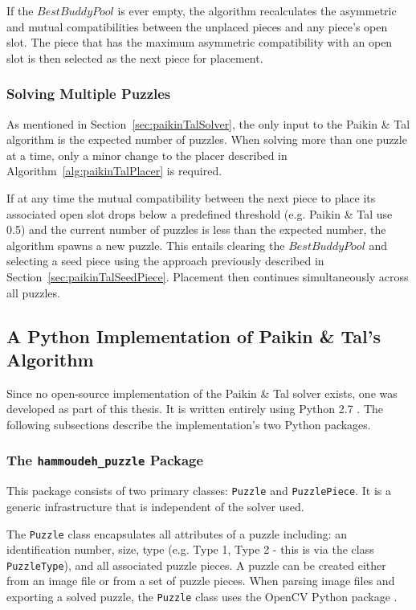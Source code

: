 \documentclass{report}
\newcommand{\hammoudehPuzzlePackage}{\texttt{hammoudeh\_puzzle} }
\begin{document}
If the $BestBuddyPool$ is ever empty, the algorithm recalculates the asymmetric and mutual compatibilities between the unplaced pieces and any piece's open slot.  The piece that has the maximum asymmetric compatibility with an open slot is then selected as the next piece for placement.

\subsubsection{Solving Multiple Puzzles}\label{sec:paikinTalSolvingMultiplePuzzles}

As mentioned in Section~\ref{sec:paikinTalSolver}, the only input to the Paikin \& Tal algorithm is the expected number of puzzles.   When solving more than one puzzle at a time, only a minor change to the placer described in Algorithm~\ref{alg:paikinTalPlacer} is required.

If at any time the mutual compatibility between the next piece to place its associated open slot drops below a predefined threshold (e.g. Paikin \& Tal use 0.5) and the current number of puzzles is less than the expected number, the algorithm spawns a new puzzle.  This entails clearing the $BestBuddyPool$ and selecting a seed piece using the approach previously described in Section~\ref{sec:paikinTalSeedPiece}.   Placement then continues simultaneously across all puzzles.


\subsection{A Python Implementation of Paikin \& Tal's Algorithm}\label{sec:pythonPaikinTalAlgorithm}

Since no open-source implementation of the Paikin \& Tal solver exists, one was developed as part of this thesis.  It is written entirely using Python 2.7 \cite{python}.  The following subsections describe the implementation's two  Python packages.  

\subsubsection{The \hammoudehPuzzlePackage Package}\label{sec:hammoudehPuzzlePackage}

This package consists of two primary classes: \texttt{Puzzle} and \texttt{PuzzlePiece}.  It is a generic infrastructure that is independent of the solver used.  

The \texttt{Puzzle} class encapsulates all attributes of a puzzle including: an identification number, size, type (e.g. Type 1, Type 2 - this is via the class \texttt{PuzzleType}), and all associated puzzle pieces.  A puzzle can be created either from an image file or from a set of puzzle pieces.   When parsing image files and exporting a solved puzzle, the \texttt{Puzzle} class uses the OpenCV Python package \cite{opencv_library}. 
\end{document}
